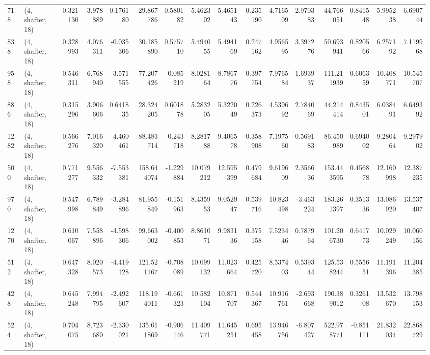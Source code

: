 \begin{tabular}{llrrrrrrrrrrrrrr}
718  &  (4, shafter, 18) &   0.321130 &   3.978889 &   0.176180 &     29.867786 &    0.580182 &    5.462302 &    5.465143 &  0.235190 &   4.716509 &   2.970383 &    44.766051 &   0.841548 &   5.995238 &   6.690744 \\
838  &  (4, shafter, 18) &   0.328993 &   4.076311 &  -0.035306 &     30.185890 &    0.575710 &    5.494055 &    5.494169 &  0.247162 &   4.956595 &   3.397276 &    50.693941 &   0.820566 &   6.257192 &   7.119968 \\
958  &  (4, shafter, 18) &   0.546311 &   6.768940 &  -3.571555 &     77.207426 &   -0.085219 &    8.028164 &    8.786776 &  0.397754 &   7.976584 &   1.693937 &   111.211939 &   0.606359 &  10.408771 &  10.545707 \\
886  &  (4, shafter, 18) &   0.315296 &   3.906606 &   0.641835 &     28.324205 &    0.601878 &    5.283205 &    5.322049 &  0.226373 &   4.539692 &   2.784069 &    44.214414 &   0.843501 &   6.038491 &   6.649392 \\
1282 &  (4, shafter, 18) &   0.566276 &   7.016320 &  -4.460461 &     88.483714 &   -0.243718 &    8.281788 &    9.406578 &  0.358908 &   7.197560 &   0.569183 &    86.450989 &   0.694002 &   9.280464 &   9.297902 \\
500  &  (4, shafter, 18) &   0.771277 &   9.556332 &  -7.553381 &    158.644074 &   -1.229884 &   10.079212 &   12.595399 &  0.479684 &   9.619609 &   2.356636 &   153.443595 &   0.456878 &  12.160998 &  12.387235 \\
970  &  (4, shafter, 18) &   0.547998 &   6.789849 &  -3.284896 &     81.955849 &   -0.151963 &    8.435953 &    9.052947 &  0.539716 &  10.823498 &  -3.463224 &   183.261397 &   0.351336 &  13.086920 &  13.537407 \\
1270 &  (4, shafter, 18) &   0.610067 &   7.558896 &  -4.598306 &     99.663002 &   -0.400853 &    8.861071 &    9.983136 &  0.375158 &   7.523446 &   0.787964 &   101.206730 &   0.641773 &  10.029249 &  10.060156 \\
512  &  (4, shafter, 18) &   0.647328 &   8.020573 &  -4.419128 &    121.521167 &   -0.708089 &   10.099132 &   11.023664 &  0.425720 &   8.537403 &   0.539344 &   125.538244 &   0.555651 &  11.191396 &  11.204385 \\
428  &  (4, shafter, 18) &   0.645248 &   7.994795 &  -2.492607 &    118.194011 &   -0.661323 &   10.582104 &   10.871707 &  0.544367 &  10.916761 &  -2.693668 &   190.389012 &   0.326108 &  13.532670 &  13.798153 \\
524  &  (4, shafter, 18) &   0.704075 &   8.723680 &  -2.330021 &    135.611869 &   -0.906146 &   11.409771 &   11.645251 &  0.695458 &  13.946756 &  -6.807427 &   522.978771 &  -0.851111 &  21.832034 &  22.868729 \\

\end{tabular}
